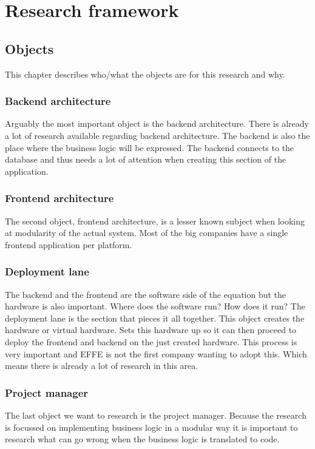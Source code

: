 \section{Research framework}

\subsection{Objects}
This chapter describes who/what the objects are for this research and why.

\subsubsection{Backend architecture}
Arguably the most important object is the backend architecture. There is already a lot of research available regarding backend architecture. The backend is also the place where the business logic will be expressed. The backend connects to the database and thus needs a lot of attention when creating this section of the application.

\subsubsection{Frontend architecture}
The second object, frontend architecture, is a lesser known subject when looking at modularity of the actual system. Most of the big companies have a single frontend application per platform.

\subsubsection{Deployment lane}
\label{sec:DeploymentLane}
The backend and the frontend are the software side of the equation but the hardware is also important. Where does the software run? How does it run? The deployment lane is the section that pieces it all together. This object creates the hardware or virtual hardware. Sets this hardware up so it can then proceed to deploy the frontend and backend on the just created hardware. This process is very important and EFFE is not the first company wanting to adopt this. Which means there is already a lot of research in this area.

\subsubsection{Project manager}
\label{sec:ProjectManager}
The last object we want to research is the project manager. Because the research is focussed on implementing business logic in a modular way it is important to research what can go wrong when the business logic is translated to code.

